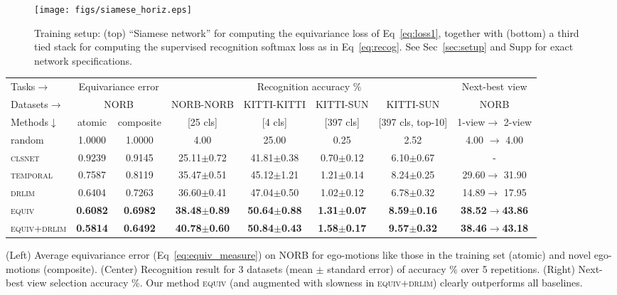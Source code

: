 \documentclass[10pt,twocolumn,letterpaper]{article}
\begin{document}
\begin{figure}[t]
  \centering
  \texttt{[image: figs/siamese\_horiz.eps]}
  \caption{Training setup: (top) ``Siamese network'' for computing the equivariance loss of Eq~\eqref{eq:loss1}, together with (bottom) a third tied stack for computing the supervised recognition softmax loss as in Eq~\eqref{eq:recog}.  See Sec~\ref{sec:setup} and Supp for exact network specifications.
}
\vspace{-0.05in}
  \label{fig:siamese}
\end{figure}%
  \centering
    \small{
    \begin{tabular}{|l|cc|cccc|c|}
    \hline
    Tasks$\rightarrow$ & \multicolumn{2}{c|}{Equivariance error} &  \multicolumn{4}{c|}{Recognition accuracy \%} & {Next-best view} \\
    Datasets$\rightarrow$         &  \multicolumn{2}{c|}{NORB}  &  NORB-NORB     &  KITTI-KITTI   & KITTI-SUN & KITTI-SUN  & {NORB} \\
    Methods$\downarrow$          & atomic       &  composite &   [25 cls]    &  [4 cls]       & [397 cls] & [397 cls, top-10]& 1-view$\rightarrow$ 2-view \\ \hline
    random           & 1.0000       & 1.0000     &   4.00        &   25.00        &   0.25    &   2.52    & 4.00 $\rightarrow$ 4.00 \\
    \textsc{clsnet}&0.9239 & 0.9145                         &25.11$\pm$0.72 & 41.81$\pm$0.38 & 0.70$\pm$0.12  & 6.10$\pm$0.67  & - \\
    \textsc{temporal}~\cite{Mobahi2009}&0.7587 & 0.8119     &35.47$\pm$0.51 & 45.12$\pm$1.21 & 1.21$\pm$0.14  & 8.24$\pm$0.25  & 29.60$\rightarrow$ 31.90 \\
    \textsc{drlim}~\cite{drlim}&0.6404 & 0.7263             &36.60$\pm$0.41 & 47.04$\pm$0.50 & 1.02$\pm$0.12  & 6.78$\pm$0.32  & 14.89$\rightarrow$  17.95 \\
    \textsc{equiv}& \textbf{0.6082} & \textbf{0.6982}                          &\textbf{38.48$\pm$0.89} & \textbf{50.64$\pm$0.88} & \textbf{1.31$\pm$0.07} & \textbf{8.59$\pm$0.16} & \textbf{38.52}\textbf{$\rightarrow$}\textbf{43.86}\\
    \textsc{equiv+drlim}& \textbf{0.5814} & \textbf{0.6492} &\textbf{40.78$\pm$0.60} &\textbf{50.84$\pm$0.43}  &\textbf{1.58$\pm$0.17} & \textbf{9.57$\pm$0.32} & \textbf{38.46}\textbf{$\rightarrow$}\textbf{43.18} \\ \hline
    \end{tabular}
}
\caption{(Left) Average equivariance error (Eq~\eqref{eq:equiv_measure}) on NORB for ego-motions like those in the training set (atomic) and novel ego-motions (composite). (Center) Recognition result for 3 datasets (mean $\pm$ standard error) of accuracy \% over 5 repetitions. (Right) Next-best view selection accuracy \%. Our method \textsc{equiv} (and augmented with slowness in \textsc{equiv+drlim}) clearly outperforms all baselines.}
\end{document}
